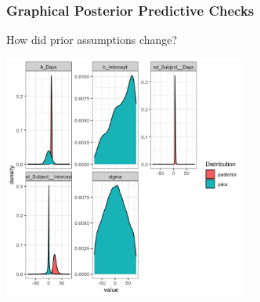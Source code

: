 \documentclass{beamer}
\begin{document}
\begin{frame}[fragile]
    \frametitle{Graphical Posterior Predictive Checks}
    \begin{center}
    How did prior assumptions change? \vspace{0.2cm}
    
        \includegraphics[width=0.6\textwidth]{lectures/day_12_bayesian_lm_II/figures/unnamed-chunk-20-1.png}
    \end{center}
\end{frame}
\end{document}
